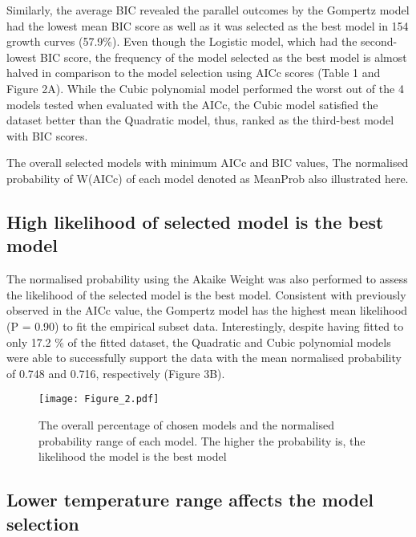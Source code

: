 \documentclass[12pt]{article}
\begin{document}
\begin{linenumbers}
\vspace{0.5cm}

\noindent Similarly, the average BIC revealed the parallel outcomes by the Gompertz model had the lowest mean BIC score as well as it was selected as the best model in 154 growth curves (57.9\%). Even though the Logistic model, which had the second-lowest BIC score, the frequency of the model selected as the best model is almost halved in comparison to the model selection using AICc scores (Table 1 and Figure 2A). While the Cubic polynomial model performed the worst out of the 4 models tested when evaluated with the AICc, the Cubic model satisfied the dataset better than the Quadratic model, thus, ranked as the third-best model with BIC scores.

    \begin{table}[H]
        \vspace{0.5cm}
    \caption{The overall selected models with minimum AICc and BIC values, The normalised probability of W(AICc) of each model denoted as MeanProb also illustrated here.}
    \end{table}

\subsection{High likelihood of selected model is the best model}

\noindent The normalised probability using the Akaike Weight was also performed to assess the likelihood of the selected model is the best model. Consistent with previously observed in the AICc value, the Gompertz model has the highest mean likelihood (P = 0.90) to fit the empirical subset data. Interestingly, despite having fitted to only 17.2 \% of the fitted dataset, the Quadratic and Cubic polynomial models were able to successfully support the data with the mean normalised probability of 0.748 and 0.716, respectively (Figure 3B).

  \begin{figure}[H]
    \centering
    \texttt{[image: Figure\_2.pdf]}
    \caption{The overall percentage of chosen models and the normalised probability range of each model. The higher the probability is, the likelihood the model is the best model}
  \end{figure}

\subsection{Lower temperature range affects the model selection}


\end{linenumbers}
\end{document}
